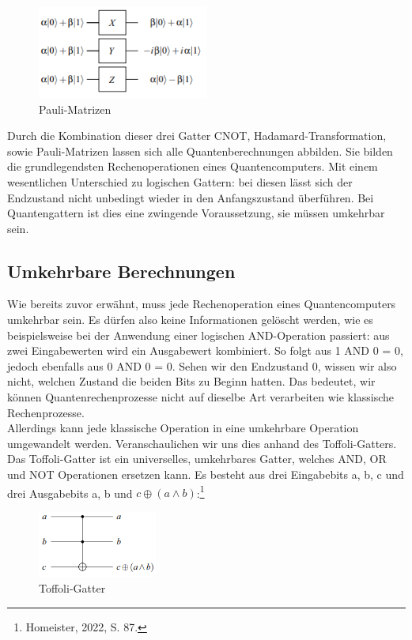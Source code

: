 \begin{figure}[H]
    \centering
    \includegraphics[width=0.5\textwidth]{img/Quantengatter Pauli_Matrizen}
    \caption{Pauli-Matrizen}
    \label{fig:pauli-matrizen}
\end{figure}

Durch die Kombination dieser drei Gatter CNOT, Hadamard-Transformation, sowie Pauli-Matrizen lassen sich alle Quantenberechnungen abbilden.
Sie bilden die grundlegendsten Rechenoperationen eines Quantencomputers.
Mit einem wesentlichen Unterschied zu logischen Gattern: bei diesen lässt sich der Endzustand nicht unbedingt wieder in den Anfangszustand überführen.
Bei Quantengattern ist dies eine zwingende Voraussetzung, sie müssen umkehrbar sein.\\


\subsection{Umkehrbare Berechnungen}
\label{subsec:umkehrbare-berechnungen}

Wie bereits zuvor erwähnt, muss jede Rechenoperation eines Quantencomputers umkehrbar sein.
Es dürfen also keine Informationen gelöscht werden, wie es beispielsweise bei der Anwendung einer logischen AND-Operation passiert: aus zwei Eingabewerten wird ein Ausgabewert kombiniert.
So folgt aus 1 AND 0 = 0, jedoch ebenfalls aus 0 AND 0 = 0.
Sehen wir den Endzustand 0, wissen wir also nicht, welchen Zustand die beiden Bits zu Beginn hatten.
Das bedeutet, wir können Quantenrechenprozesse nicht auf dieselbe Art verarbeiten wie klassische Rechenprozesse.\\

Allerdings kann jede klassische Operation in eine umkehrbare Operation umgewandelt werden.
Veranschaulichen wir uns dies anhand des Toffoli-Gatters.\\

Das Toffoli-Gatter ist ein universelles, umkehrbares Gatter, welches AND, OR und NOT Operationen ersetzen kann.
Es besteht aus drei Eingabebits a, b, c und drei Ausgabebits a, b und $c\oplus(a\land b)$:\footnote{Homeister, 2022, S. 87.}\\
\begin{figure}[H]
    \centering
    \includegraphics[width=0.35\textwidth]{img/Umkehrbare_Berechnungen Toffoli}
    \caption{Toffoli-Gatter}
    \label{fig:toffoli-gatter}
\end{figure}

